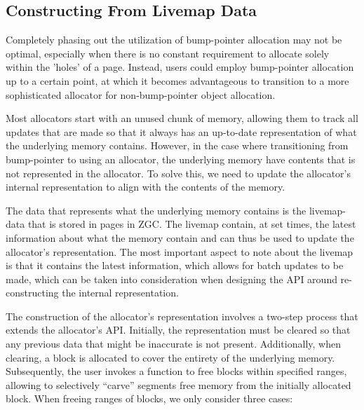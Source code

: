 

\subsection{Constructing From Livemap Data}

Completely phasing out the utilization of bump-pointer allocation may not be optimal, especially when there is no constant requirement to allocate solely within the 'holes' of a page. Instead, users could employ bump-pointer allocation up to a certain point, at which it becomes advantageous to transition to a more sophisticated allocator for non-bump-pointer object allocation.

Most allocators start with an unused chunk of memory, allowing them to track all updates that are made so that it always has an up-to-date representation of what the underlying memory contains. However, in the case where transitioning from bump-pointer to using an allocator, the underlying memory have contents that is not represented in the allocator. To solve this, we need to update the allocator's internal representation to align with the contents of the memory.

The data that represents what the underlying memory contains is the livemap-data that is stored in pages in ZGC. The livemap contain, at set times, the latest information about what the memory contain and can thus be used to update the allocator's representation. The most important aspect to note about the livemap is that it contains the latest information, which allows for batch updates to be made, which can be taken into consideration when designing the API around re-constructing the internal representation.

The construction of the allocator's representation involves a two-step process that extends the allocator's API. Initially, the representation must be cleared so that any previous data that might be inaccurate is not present. Additionally, when clearing, a block is allocated to cover the entirety of the underlying memory. Subsequently, the user invokes a function to free blocks within specified ranges, allowing to selectively ``carve'' segments free memory from the initially allocated block. When freeing ranges of blocks, we only consider three cases: 

